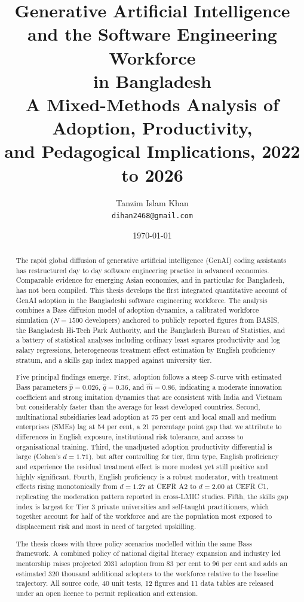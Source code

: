 \documentclass[11pt,a4paper]{report}
\title{
  \vspace{-2.0cm}
  \LARGE\bfseries Generative Artificial Intelligence \\ and the Software Engineering Workforce \\ in Bangladesh \\[10pt]
  \large A Mixed-Methods Analysis of Adoption, Productivity, \\ and Pedagogical Implications, 2022 to 2026
}
\author{Tanzim Islam Khan\\ \texttt{dihan2468@gmail.com}}
\date{\today}
\begin{document}
\maketitle

\begin{abstract}
\noindent
The rapid global diffusion of generative artificial intelligence (GenAI)
coding assistants has restructured day to day software engineering practice
in advanced economies. Comparable evidence for emerging Asian economies, and
in particular for Bangladesh, has not been compiled. This thesis develops
the first integrated quantitative account of GenAI adoption in the
Bangladeshi software engineering workforce. The analysis combines a Bass
diffusion model of adoption dynamics, a calibrated workforce simulation
($N = 1500$ developers) anchored to publicly reported figures from BASIS,
the Bangladesh Hi-Tech Park Authority, and the Bangladesh Bureau of
Statistics, and a battery of statistical analyses including ordinary least
squares productivity and log salary regressions, heterogeneous treatment
effect estimation by English proficiency stratum, and a skills gap index
mapped against university tier.

Five principal findings emerge. First, adoption follows a steep S-curve
with estimated Bass parameters $\hat{p} = 0.026$, $\hat{q} = 0.36$, and
$\hat{m} = 0.86$, indicating a moderate innovation coefficient and strong
imitation dynamics that are consistent with India and Vietnam but
considerably faster than the average for least developed countries.
Second, multinational subsidiaries lead adoption at 75 per cent and local
small and medium enterprises (SMEs) lag at 54 per cent, a 21 percentage
point gap that we attribute to differences in English exposure,
institutional risk tolerance, and access to organisational training.
Third, the unadjusted adoption productivity differential is large
(Cohen's $d = 1.71$), but after controlling for tier, firm type, English
proficiency and experience the residual treatment effect is more modest
yet still positive and highly significant. Fourth, English proficiency is
a robust moderator, with treatment effects rising monotonically from
$d = 1.27$ at CEFR A2 to $d = 2.00$ at CEFR C1, replicating the
moderation pattern reported in cross-LMIC studies. Fifth, the skills gap
index is largest for Tier 3 private universities and self-taught
practitioners, which together account for half of the workforce and are
the population most exposed to displacement risk and most in need of
targeted upskilling.

The thesis closes with three policy scenarios modelled within the same
Bass framework. A combined policy of national digital literacy expansion
and industry led mentorship raises projected 2031 adoption from
83 per cent to 96 per cent and adds an estimated 320 thousand additional
adopters to the workforce relative to the baseline trajectory. All source
code, 40 unit tests, 12 figures and 11 data tables are released under an
open licence to permit replication and extension.
\end{abstract}
\end{document}
